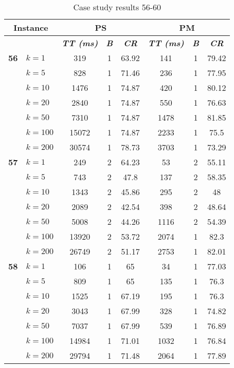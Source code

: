     \begin{table}[htbp]
    \caption{Case study results 56-60}
    \centering
    \begin{tabular}{|l|l|c|c|c|c|c|c|}
    \hline
    \multicolumn{ 2}{|c|}{\textbf{Instance}} & \multicolumn{ 3}{c|}{\textbf{PS}} & \multicolumn{ 3}{c|}{\textbf{PM}} \\ \hline
    \multicolumn{ 2}{|l|}{} & \textbf{\textit{TT (ms)}} & \textbf{\textit{B}} & \textbf{\textit{CR}} & \textbf{\textit{TT (ms)}} & \textbf{\textit{B}} & \textbf{\textit{CR}} \\ \hline
    \multicolumn{1}{|r|}{\textbf{56}} & $k=1$ & 319 & 1 & 63.92 & 141 & 1 & 79.42 \\ 
     & $k=5$ & 828 & 1 & 71.46 & 236 & 1 & 77.95 \\ 
     & $k=10$ & 1476 & 1 & 74.87 & 420 & 1 & 80.12 \\ 
     & $k=20$ & 2840 & 1 & 74.87 & 550 & 1 & 76.63 \\ 
     & $k=50$ & 7310 & 1 & 74.87 & 1478 & 1 & 81.85 \\ 
     & $k=100$ & 15072 & 1 & 74.87 & 2233 & 1 & 75.5 \\ 
     & $k=200$ & 30574 & 1 & 78.73 & 3703 & 1 & 73.29 \\ \hline
    \multicolumn{1}{|r|}{\textbf{57}} & $k=1$ & 249 & 2 & 64.23 & 53 & 2 & 55.11 \\ 
     & $k=5$ & 743 & 2 & 47.8 & 137 & 2 & 58.35 \\ 
     & $k=10$ & 1343 & 2 & 45.86 & 295 & 2 & 48 \\ 
     & $k=20$ & 2089 & 2 & 42.54 & 398 & 2 & 48.64 \\ 
     & $k=50$ & 5008 & 2 & 44.26 & 1116 & 2 & 54.39 \\ 
     & $k=100$ & 13920 & 2 & 53.72 & 2074 & 1 & 82.3 \\ 
     & $k=200$ & 26749 & 2 & 51.17 & 2753 & 1 & 82.01 \\ \hline
    \multicolumn{1}{|r|}{\textbf{58}} & $k=1$ & 106 & 1 & 65 & 34 & 1 & 77.03 \\ 
     & $k=5$ & 809 & 1 & 65 & 135 & 1 & 76.3 \\ 
     & $k=10$ & 1525 & 1 & 67.19 & 195 & 1 & 76.3 \\ 
     & $k=20$ & 3043 & 1 & 67.99 & 328 & 1 & 74.82 \\ 
     & $k=50$ & 7037 & 1 & 67.99 & 539 & 1 & 76.89 \\ 
     & $k=100$ & 14984 & 1 & 71.01 & 1032 & 1 & 76.84 \\ 
     & $k=200$ & 29794 & 1 & 71.48 & 2064 & 1 & 77.89 \\ \hline

\end{tabular}
\end{table}
